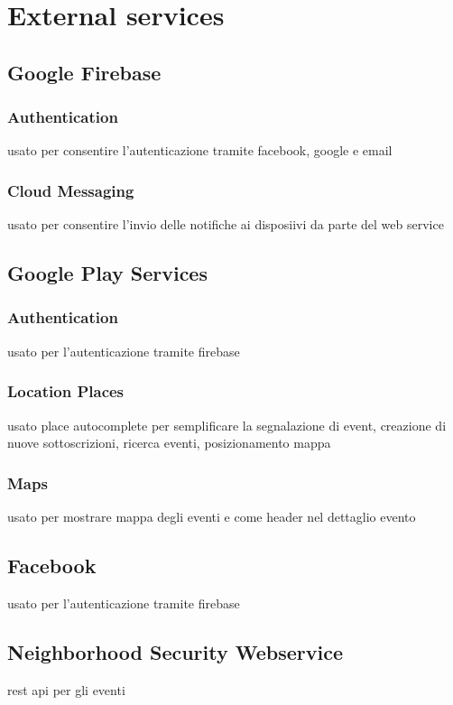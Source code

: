 \documentclass[a4paper]{scrreprt}
\begin{document}
\chapter{External services}

\section{Google Firebase}

\subsection{Authentication}
usato per consentire l'autenticazione tramite facebook, google e email

\subsection{Cloud Messaging}
usato per consentire l'invio delle notifiche ai disposiivi da parte del web service

\section{Google Play Services}

\subsection{Authentication}
usato per l'autenticazione tramite firebase

\subsection{Location Places}
usato place autocomplete per semplificare la segnalazione di event, creazione di nuove sottoscrizioni, ricerca eventi, posizionamento mappa

\subsection{Maps}
usato per mostrare mappa degli eventi e come header nel dettaglio evento

\section{Facebook}
usato per l'autenticazione tramite firebase

\section{Neighborhood Security Webservice}
rest api per gli  eventi 
\end{document}
